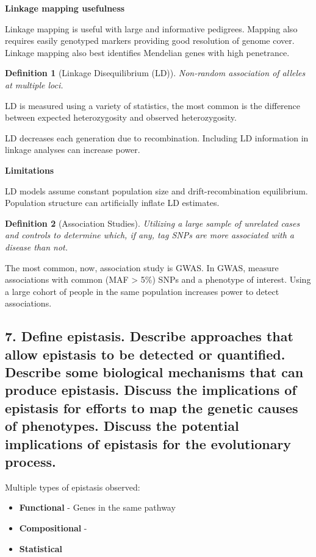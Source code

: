 \documentclass{tufte-handout}
\theoremstyle{noparens}
\newtheorem*{define}{Definition}
\begin{document}
\noindent
\textbf{Linkage mapping usefulness}

Linkage mapping is useful with large and informative pedigrees. Mapping also requires easily genotyped markers providing good resolution of genome cover. Linkage mapping also best identifies Mendelian genes with high penetrance.

\begin{define}[Linkage Disequilibrium (LD)]
Non-random association of alleles at multiple loci.
\end{define}

LD is measured using a variety of statistics, the most common is the difference between expected heterozygosity and observed heterozygosity.

LD decreases each generation due to recombination. Including LD information in linkage analyses can increase power. 

\textbf{Limitations}

LD models assume constant population size and drift-recombination equilibrium. Population structure can artificially inflate LD estimates.

\begin{define}[Association Studies]
Utilizing a large sample of unrelated cases and controls to determine which, if any, tag SNPs are more associated with a disease than not.
\end{define}

The most common, now, association study is GWAS. In GWAS, measure associations with common (MAF > 5\%) SNPs and a phenotype of interest. Using a large cohort of people in the same population increases power to detect associations.

\newpage
\subsection{7.
Define epistasis. Describe approaches that allow epistasis to be detected or quantified. Describe some biological mechanisms that can produce epistasis. Discuss the implications of epistasis for efforts to map the genetic causes of phenotypes. Discuss the potential implications of epistasis for the evolutionary process.}
\label{subsec:07}

Multiple types of epistasis observed:

\begin{itemize}
\item \textbf{Functional} - Genes in the same pathway
\item \textbf{Compositional} - 
\item \textbf{Statistical}
\end{itemize}
\end{document}
